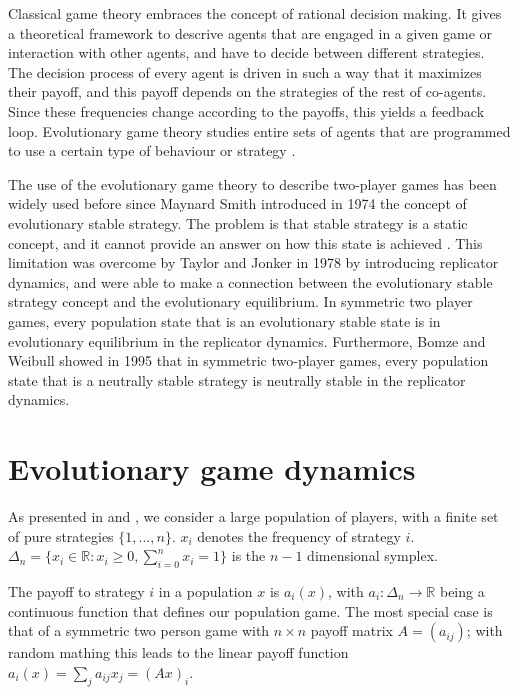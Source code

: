 \documentclass[10pt,a4paper]{article}
\begin{document}
Classical game theory embraces the concept of rational decision making. It gives a theoretical framework to descrive 
agents that are engaged in a given game or interaction with other agents, and have to decide between different strategies.
The decision process of every agent is driven in such a way that it maximizes their payoff, and this payoff depends on the strategies
of the rest of co-agents. Since these frequencies change according to the payoffs, this yields a
feedback loop. Evolutionary game theory studies entire sets of agents that are programmed to use a certain type of
behaviour or strategy \cite{Hofbauer:evolutionary}. 

The use of the evolutionary game theory to describe two-player games has been widely used before since Maynard Smith introduced \cite{Smith:1974} in 1974 
the concept of evolutionary stable strategy. The problem is that stable strategy is a static concept, and it cannot provide an answer on how this 
state is achieved \cite{Silva:2011}. This limitation was overcome by Taylor and Jonker \cite{Jonker:1978} in 1978 by introducing replicator dynamics, and
were able to make a connection between the evolutionary stable strategy concept and the evolutionary equilibrium. In symmetric two player games, every
population state that is an evolutionary stable state is in evolutionary equilibrium in the replicator dynamics. Furthermore, Bomze and Weibull showed 
\cite{Bomze:1995} in 1995 that in symmetric two-player games, every population state that is a neutrally stable strategy is neutrally stable in the replicator
dynamics.

\section{Evolutionary game dynamics}

As presented in  \cite{Hofbauer:evolutionary} and \cite{Hofbauer:deterministic}, we consider a large population of players, with a finite set 
of pure strategies $\{1,...,n\}$. $x_i$ denotes the frequency of strategy $i$. 
$\Delta_n= \{x_i \in\mathbb{R} : x_i \geq 0, \sum_{i=0}^n x_i = 1 \}$ is the $n-1$ dimensional symplex.

The payoff to strategy $i$ in a population $x$ is $a_i (x) $, with $a_i : \Delta_n \rightarrow \mathbb{R}$ being a continuous function that defines our
population game. The most special case is that of a symmetric two person game with $n\times n$ payoff matrix $A = (a_{ij})$; with random mathing this leads to 
the linear payoff function $a_i(x) = \sum_j a_{ij} x_j = (Ax)_i$.
\end{document}
